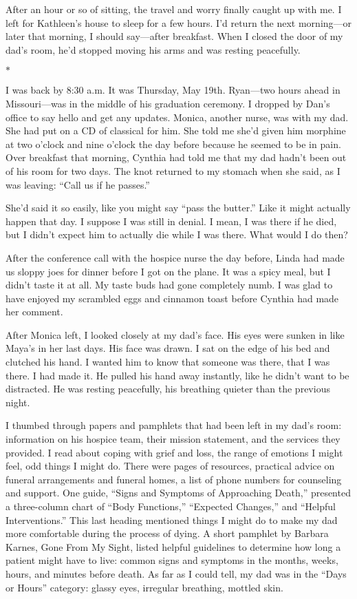 \documentclass[12pt]{book}
\begin{document}
After an hour or so of sitting, the travel and worry finally caught up with me. I left for Kathleen's house to sleep for a few hours. I'd return the next morning---or later that morning, I should say---after breakfast. When I closed the door of my dad's room, he'd stopped moving his arms and was resting peacefully.

\begin{center}$*$\end{center}

I was back by 8:30 a.m. It was Thursday, May 19th. Ryan---two hours ahead in Missouri---was in the middle of his graduation ceremony. I dropped by Dan's office to say hello and get any updates. Monica, another nurse, was with my dad. She had put on a CD of classical for him. She told me she'd given him morphine at two o'clock and nine o'clock the day before because he seemed to be in pain. Over breakfast that morning, Cynthia had told me that my dad hadn't been out of his room for two days. The knot returned to my stomach when she said, as I was leaving: ``Call us if he passes.''

She'd said it so easily, like you might say ``pass the butter.'' Like it might actually happen that day. I suppose I was still in denial. I mean, I was there if he died, but I didn't expect him to actually die while I was there. What would I do then?

After the conference call with the hospice nurse the day before, Linda had made us sloppy joes for dinner before I got on the plane. It was a spicy meal, but I didn't taste it at all. My taste buds had gone completely numb. I was glad to have enjoyed my scrambled eggs and cinnamon toast before Cynthia had made her comment.

After Monica left, I looked closely at my dad's face. His eyes were sunken in like Maya's in her last days. His face was drawn. I sat on the edge of his bed and clutched his hand. I wanted him to know that someone was there, that I was there. I had made it. He pulled his hand away instantly, like he didn't want to be distracted. He was resting peacefully, his breathing quieter than the previous night.

I thumbed through papers and pamphlets that had been left in my dad's room: information on his hospice team, their mission statement, and the services they provided. I read about coping with grief and loss, the range of emotions I might feel, odd things I might do. There were pages of resources, practical advice on funeral arrangements and funeral homes, a list of phone numbers for counseling and support. One guide, ``Signs and Symptoms of Approaching Death,'' presented a three-column chart of ``Body Functions,'' ``Expected Changes,'' and ``Helpful Interventions.'' This last heading mentioned things I might do to make my dad more comfortable during the process of dying. A short pamphlet by Barbara Karnes, Gone From My Sight, listed helpful guidelines to determine how long a patient might have to live: common signs and symptoms in the months, weeks, hours, and minutes before death. As far as I could tell, my dad was in the ``Days or Hours'' category: glassy eyes, irregular breathing, mottled skin.
\end{document}
